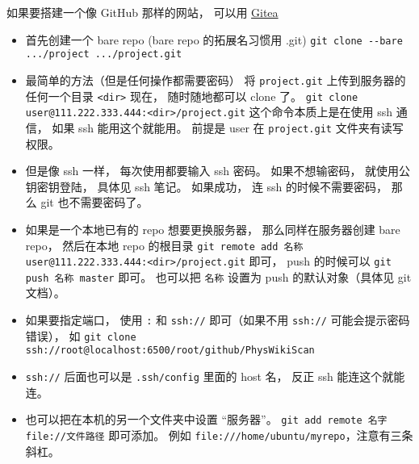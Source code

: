 
\begin{issues}
\issueDraft
\end{issues}


如果要搭建一个像 GitHub 那样的网站， 可以用 \href{https://github.com/go-gitea/gitea}{Gitea}

\begin{itemize}
\item 首先创建一个 bare repo (bare repo 的拓展名习惯用 .git)
\verb`git clone --bare .../project .../project.git`

\item 最简单的方法（但是任何操作都需要密码）
将 \verb`project.git` 上传到服务器的任何一个目录 \verb`<dir>`
现在， 随时随地都可以 clone 了。
\verb`git clone user@111.222.333.444:<dir>/project.git`
这个命令本质上是在使用 ssh 通信， 如果 ssh 能用这个就能用。
前提是 user 在 \verb`project.git` 文件夹有读写权限。

\item 但是像 ssh 一样， 每次使用都要输入 ssh 密码。 如果不想输密码， 就使用公钥密钥登陆， 具体见 ssh 笔记。 如果成功， 连 ssh 的时候不需要密码， 那么 git 也不需要密码了。

\item 如果是一个本地已有的 repo 想要更换服务器， 那么同样在服务器创建 bare repo， 然后在本地 repo 的根目录 \verb`git remote add 名称 user@111.222.333.444:<dir>/project.git` 即可， push 的时候可以 \verb`git push 名称 master` 即可。 也可以把 \verb`名称` 设置为 push 的默认对象（具体见 git 文档）。

\item 如果要指定端口， 使用 \verb`:` 和 \verb`ssh://` 即可（如果不用 \verb`ssh://` 可能会提示密码错误）， 如 \verb`git clone ssh://root@localhost:6500/root/github/PhysWikiScan`

\item \verb`ssh://` 后面也可以是 \verb`.ssh/config` 里面的 host 名， 反正 ssh 能连这个就能连。

\item 也可以把在本机的另一个文件夹中设置 “服务器”。 \verb`git add remote 名字 file://文件路径` 即可添加。 例如 \verb`file:///home/ubuntu/myrepo`，注意有三条斜杠。
\end{itemize}


